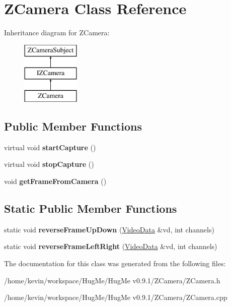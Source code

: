 \hypertarget{classZCamera}{
\section{ZCamera Class Reference}
\label{classZCamera}
}
Inheritance diagram for ZCamera:\begin{figure}[H]
\begin{center}
\leavevmode
\includegraphics[height=3.000000cm]{classZCamera}
\end{center}
\end{figure}
\subsection*{Public Member Functions}
\begin{DoxyCompactItemize}
\item 
\hypertarget{classZCamera_a9eb62d7424767779dc46cc357ae77645}{
virtual void {\bfseries startCapture} ()}
\label{classZCamera_a9eb62d7424767779dc46cc357ae77645}

\item 
\hypertarget{classZCamera_af883a28008906c04065644c5e8eb4e40}{
virtual void {\bfseries stopCapture} ()}
\label{classZCamera_af883a28008906c04065644c5e8eb4e40}

\item 
\hypertarget{classZCamera_a9f26639f4ca64617b67fc13775d4bf84}{
void {\bfseries getFrameFromCamera} ()}
\label{classZCamera_a9f26639f4ca64617b67fc13775d4bf84}

\end{DoxyCompactItemize}
\subsection*{Static Public Member Functions}
\begin{DoxyCompactItemize}
\item 
\hypertarget{classZCamera_a723ebde9648512ab731c0c1f0b82ac22}{
static void {\bfseries reverseFrameUpDown} (\hyperlink{structVideoData}{VideoData} \&vd, int channels)}
\label{classZCamera_a723ebde9648512ab731c0c1f0b82ac22}

\item 
\hypertarget{classZCamera_a71f106ccc5d3b25d733c9852be1a5641}{
static void {\bfseries reverseFrameLeftRight} (\hyperlink{structVideoData}{VideoData} \&vd, int channels)}
\label{classZCamera_a71f106ccc5d3b25d733c9852be1a5641}

\end{DoxyCompactItemize}


The documentation for this class was generated from the following files:\begin{DoxyCompactItemize}
\item 
/home/kevin/workspace/HugMe/HugMe v0.9.1/ZCamera/ZCamera.h\item 
/home/kevin/workspace/HugMe/HugMe v0.9.1/ZCamera/ZCamera.cpp\end{DoxyCompactItemize}
